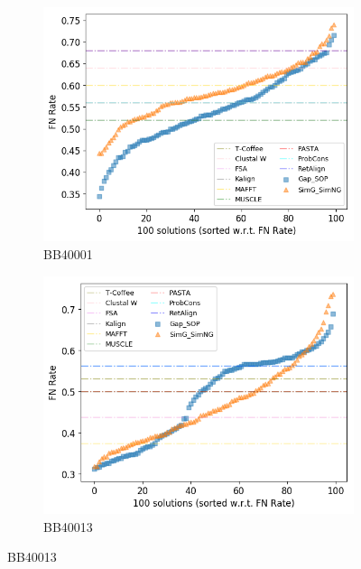 \begin{figure}[!htbp]
	\centering
	\begin{adjustwidth}{-1cm}{-1cm}
		\begin{subfigure}{0.22\textwidth}
			\includegraphics[width=\columnwidth]{Figure/summary/precomputedInit/Balibase/BB40001_fnrate_density_single_run}
			\caption{BB40001}
		\end{subfigure}	
		\begin{subfigure}{0.22\textwidth}
			\includegraphics[width=\columnwidth]{Figure/summary/precomputedInit/Balibase/BB40013_fnrate_density_single_run}
			\caption{BB40013}

\end{subfigure}
\end{adjustwidth}
\end{figure}
